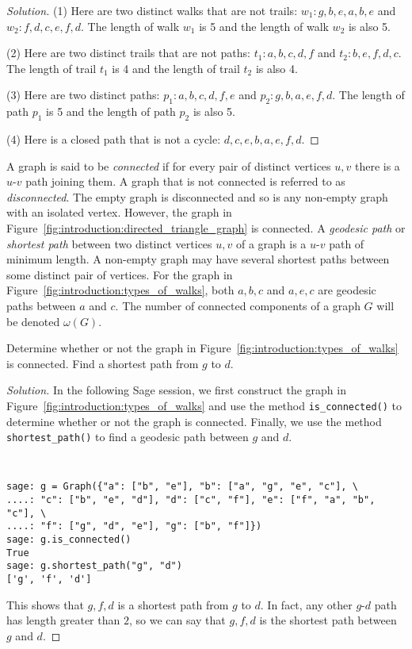 \begin{proof}[Solution]
(1) Here are two distinct walks that are not trails:
$w_1: g, b, e, a, b, e$ and $w_2: f, d, c, e, f, d$. The length of
walk $w_1$ is 5 and the length of walk $w_2$ is also 5.

(2) Here are two distinct trails that are not paths:
$t_1: a, b, c, d, f$ and $t_2: b, e, f, d, c$. The length of trail
$t_1$ is 4 and the length of trail $t_2$ is also 4.

(3) Here are two distinct paths: $p_1: a, b, c, d, f, e$ and
$p_2: g, b, a, e, f, d$. The length of path $p_1$ is 5 and the length
of path $p_2$ is also 5.

(4) Here is a closed path that is not a cycle: $d, c, e, b, a, e, f, d$.
\end{proof}

A graph is said to be \emph{connected} if for every pair of distinct
vertices $u, v$ there is a $u$-$v$ path joining them. A graph that is
not connected is referred to as \emph{disconnected}. The empty graph
is disconnected and so is any non-empty graph with an isolated
vertex. However, the graph in
Figure~\ref{fig:introduction:directed_triangle_graph} is
connected. A \emph{geodesic path} or \emph{shortest path} between two
distinct vertices $u,v$ of a graph is a $u$-$v$ path of minimum
length. A non-empty graph may have several shortest paths between some
distinct pair of vertices. For the graph in
Figure~\ref{fig:introduction:types_of_walks}, both $a,b,c$ and $a,e,c$
are geodesic paths between $a$ and $c$.
The number of connected components of a graph $G$ will be denoted
$\omega(G)$.
\index{$\omega$}

\begin{example}
Determine whether or not the graph in
Figure~\ref{fig:introduction:types_of_walks} is connected. Find a
shortest path from $g$ to $d$.
\end{example}

\begin{proof}[Solution]
In the following Sage session, we first construct the graph in
Figure~\ref{fig:introduction:types_of_walks} and use the method
\verb!is_connected()! to determine whether or not the graph is
connected. Finally, we use the method \verb!shortest_path()! to find
a geodesic path between $g$ and $d$.
%
\begin{center}
\fontsize{9pt}{9pt}
\selectfont
\tt
\begin{lstlisting}
sage: g = Graph({"a": ["b", "e"], "b": ["a", "g", "e", "c"], \
....: "c": ["b", "e", "d"], "d": ["c", "f"], "e": ["f", "a", "b", "c"], \
....: "f": ["g", "d", "e"], "g": ["b", "f"]})
sage: g.is_connected()
True
sage: g.shortest_path("g", "d")
['g', 'f', 'd']
\end{lstlisting}
\end{center}
%
This shows that $g, f, d$ is a shortest path from $g$ to $d$. In fact,
any other $g$-$d$ path has length greater than $2$, so we can say that
$g, f, d$ is the shortest path between $g$ and $d$.
\end{proof}

